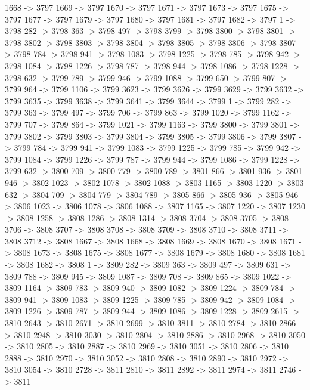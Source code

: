 {	1668 -> 3797
	1669 -> 3797
	1670 -> 3797
	1671 -> 3797
	1673 -> 3797
	1675 -> 3797
	1677 -> 3797
	1679 -> 3797
	1680 -> 3797
	1681 -> 3797
	1682 -> 3797
	1 -> 3798
	282 -> 3798
	363 -> 3798
	497 -> 3798
	3799 -> 3798
	3800 -> 3798
	3801 -> 3798
	3802 -> 3798
	3803 -> 3798
	3804 -> 3798
	3805 -> 3798
	3806 -> 3798
	3807 -> 3798
	784 -> 3798
	941 -> 3798
	1083 -> 3798
	1225 -> 3798
	785 -> 3798
	942 -> 3798
	1084 -> 3798
	1226 -> 3798
	787 -> 3798
	944 -> 3798
	1086 -> 3798
	1228 -> 3798
	632 -> 3799
	789 -> 3799
	946 -> 3799
	1088 -> 3799
	650 -> 3799
	807 -> 3799
	964 -> 3799
	1106 -> 3799
	3623 -> 3799
	3626 -> 3799
	3629 -> 3799
	3632 -> 3799
	3635 -> 3799
	3638 -> 3799
	3641 -> 3799
	3644 -> 3799
	1 -> 3799
	282 -> 3799
	363 -> 3799
	497 -> 3799
	706 -> 3799
	863 -> 3799
	1020 -> 3799
	1162 -> 3799
	707 -> 3799
	864 -> 3799
	1021 -> 3799
	1163 -> 3799
	3800 -> 3799
	3801 -> 3799
	3802 -> 3799
	3803 -> 3799
	3804 -> 3799
	3805 -> 3799
	3806 -> 3799
	3807 -> 3799
	784 -> 3799
	941 -> 3799
	1083 -> 3799
	1225 -> 3799
	785 -> 3799
	942 -> 3799
	1084 -> 3799
	1226 -> 3799
	787 -> 3799
	944 -> 3799
	1086 -> 3799
	1228 -> 3799
	632 -> 3800
	709 -> 3800
	779 -> 3800
	789 -> 3801
	866 -> 3801
	936 -> 3801
	946 -> 3802
	1023 -> 3802
	1078 -> 3802
	1088 -> 3803
	1165 -> 3803
	1220 -> 3803
	632 -> 3804
	709 -> 3804
	779 -> 3804
	789 -> 3805
	866 -> 3805
	936 -> 3805
	946 -> 3806
	1023 -> 3806
	1078 -> 3806
	1088 -> 3807
	1165 -> 3807
	1220 -> 3807
	1230 -> 3808
	1258 -> 3808
	1286 -> 3808
	1314 -> 3808
	3704 -> 3808
	3705 -> 3808
	3706 -> 3808
	3707 -> 3808
	3708 -> 3808
	3709 -> 3808
	3710 -> 3808
	3711 -> 3808
	3712 -> 3808
	1667 -> 3808
	1668 -> 3808
	1669 -> 3808
	1670 -> 3808
	1671 -> 3808
	1673 -> 3808
	1675 -> 3808
	1677 -> 3808
	1679 -> 3808
	1680 -> 3808
	1681 -> 3808
	1682 -> 3808
	1 -> 3809
	282 -> 3809
	363 -> 3809
	497 -> 3809
	631 -> 3809
	788 -> 3809
	945 -> 3809
	1087 -> 3809
	708 -> 3809
	865 -> 3809
	1022 -> 3809
	1164 -> 3809
	783 -> 3809
	940 -> 3809
	1082 -> 3809
	1224 -> 3809
	784 -> 3809
	941 -> 3809
	1083 -> 3809
	1225 -> 3809
	785 -> 3809
	942 -> 3809
	1084 -> 3809
	1226 -> 3809
	787 -> 3809
	944 -> 3809
	1086 -> 3809
	1228 -> 3809
	2615 -> 3810
	2643 -> 3810
	2671 -> 3810
	2699 -> 3810
	3811 -> 3810
	2784 -> 3810
	2866 -> 3810
	2948 -> 3810
	3030 -> 3810
	2804 -> 3810
	2886 -> 3810
	2968 -> 3810
	3050 -> 3810
	2805 -> 3810
	2887 -> 3810
	2969 -> 3810
	3051 -> 3810
	2806 -> 3810
	2888 -> 3810
	2970 -> 3810
	3052 -> 3810
	2808 -> 3810
	2890 -> 3810
	2972 -> 3810
	3054 -> 3810
	2728 -> 3811
	2810 -> 3811
	2892 -> 3811
	2974 -> 3811
	2746 -> 3811
}
